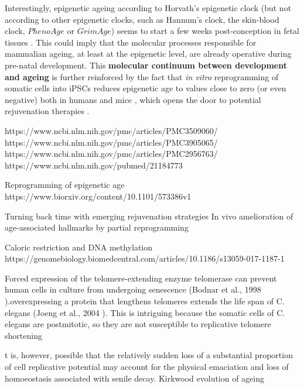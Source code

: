 Interestingly, epigenetic ageing according to Horvath's epigenetic clock (but not according to other epigenetic clocks, such as Hannum's clock, the skin-blood clock, $PhenoAge$ or $GrimAge$) seems to start a few weeks post-conception in fetal tissues \cite{Hoshino2019}. This could imply that the molecular processes responsible for mammalian ageing, at least at the epigenetic level, are already operative during pre-natal development. This \textbf{molecular continuum between development and ageing} is further reinforced by the fact that \textit{in vitro} reprogramming of somatic cells into \acrshort{iPSCs} reduces epigenetic age to values close to zero (or even negative) both in humans \cite{Horvath2013} and mice \cite{Petkovich2017,Meer2018}, which opens the door to potential rejuvenation therapies \cite{Rando2012,Olova2019}. 

https://www.ncbi.nlm.nih.gov/pmc/articles/PMC3509060/
https://www.ncbi.nlm.nih.gov/pmc/articles/PMC3905065/
https://www.ncbi.nlm.nih.gov/pmc/articles/PMC2956763/
https://www.ncbi.nlm.nih.gov/pubmed/21184773

Reprogramming of epigenetic age
https://www.biorxiv.org/content/10.1101/573386v1


Turning back time with emerging rejuvenation strategies
In vivo amelioration of age-associated hallmarks by partial reprogramming

Caloric restriction and DNA methylation https://genomebiology.biomedcentral.com/articles/10.1186/s13059-017-1187-1


Forced expression of the telomere-extending enzyme telomerase can prevent human cells in culture from undergoing senescence (Bodnar et al., 1998
).overexpressing a protein that lengthens telomeres extends the life span of C. elegans (Joeng et al., 2004
). This is intriguing because the somatic cells of C. elegans are postmitotic, so they are not susceptible to replicative telomere shortening

t is, however, possible that the relatively sudden loss of a substantial proportion of cell replicative potential may account for the physical emaciation and loss of homoeostasis associated with senile decay. Kirkwood evolution of ageing


